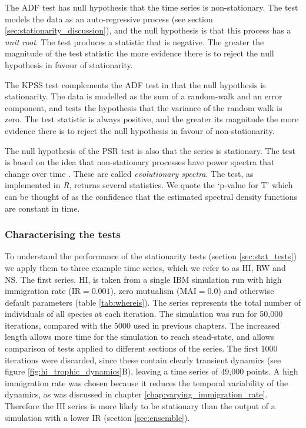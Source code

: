 The ADF test has null hypothesis that the time series is non-stationary. The test models the data as an auto-regressive process (see section \ref{sec:stationarity_discussion}), and the null hypothesis is that this process has a \emph{unit root}. The test produces a statistic that is negative. The greater the magnitude of the test statistic the more evidence there is to reject the null hypothesis in favour of stationarity.

The KPSS test complements the ADF test in that the null hypothesis is stationarity. The data is modelled as the sum of a random-walk and an error component, and tests the hypothesis that the variance of the random walk is zero. The test statistic is always positive, and the greater its magnitude the more evidence there is to reject the null hypothesis in favour of non-stationarity.

The null hypothesis of the PSR test is also that the series is stationary. The test is based on the idea that non-stationary processes have power spectra that change over time \cite{priestley1969test}. These are called \emph{evolutionary spectra}. The test, as implemented in \emph{R}, returns several statistics. We quote the `p-value for T' which can be thought of as the confidence that the estimated spectral density functions are constant in time.

\subsubsection{Characterising the tests}
\label{sec:characterising_stat_tests}


To understand the performance of the stationarity tests (section \ref{sec:stat_tests}) we apply them to three example time series, which we refer to as HI, RW and NS. The first series, HI, is taken from a single IBM simulation run with high immigration rate (IR$=0.001$), zero mutualism (MAI$=0.0$) and otherwise default parameters (table \ref{tab:whereis}).  The series represents the total number of individuals of all species at each iteration. The simulation was run for 50,000 iterations, compared with the 5000 used in previous chapters. The increased length allows more time for the simulation to reach stead-state, and allows comparison of tests applied to different sections of the series. The first 1000 iterations were discarded, since these contain clearly transient dynamics (see figure \ref{fig:hi_trophic_dynamics}B), leaving a time series of 49,000 points. A high immigration rate was chosen because it reduces the temporal variability of the dynamics, as was discussed in chapter \ref{chap:varying_immigration_rate}. Therefore the HI series is more likely to be stationary than the output of a simulation with a lower IR (section \ref{sec:ensemble}).


